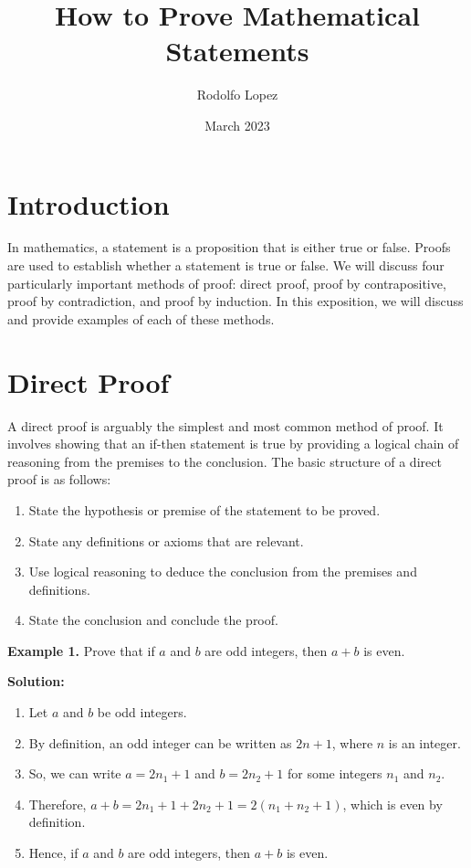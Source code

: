 \documentclass{article}
\title{How to Prove Mathematical Statements}
\author{Rodolfo Lopez}
\date{March 2023}
\begin{document}
\maketitle

\section{Introduction}

In mathematics, a statement is a proposition that is either true or false. Proofs are used to establish whether a statement is true or false. We will discuss four particularly important methods of proof: direct proof, proof by contrapositive, proof by contradiction, and proof by induction. In this exposition, we will discuss and provide examples of each of these methods. 

\section{Direct Proof}

A direct proof is arguably the simplest and most common method of proof. It involves showing that an if-then statement is true by providing a logical chain of reasoning from the premises to the conclusion. The basic structure of a direct proof is as follows:

\begin{enumerate}
\item State the hypothesis or premise of the statement to be proved.
\item State any definitions or axioms that are relevant.
\item Use logical reasoning to deduce the conclusion from the premises and definitions.
\item State the conclusion and conclude the proof.
\end{enumerate}

\noindent\textbf{Example 1.} Prove that if $a$ and $b$ are odd integers, then $a+b$ is even.

\noindent\textbf{Solution:}
\begin{enumerate}
\item Let $a$ and $b$ be odd integers.
\item By definition, an odd integer can be written as $2n+1$, where $n$ is an integer.
\item So, we can write $a=2n_1+1$ and $b=2n_2+1$ for some integers $n_1$ and $n_2$.
\item Therefore, $a+b=2n_1+1+2n_2+1=2(n_1+n_2+1)$, which is even by definition.
\item Hence, if $a$ and $b$ are odd integers, then $a+b$ is even.
\end{enumerate}
\end{document}
